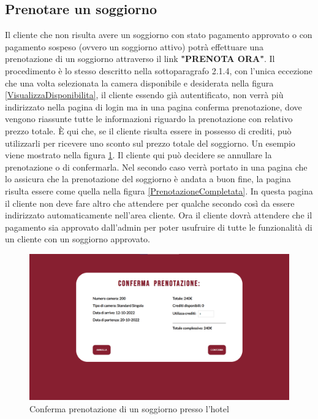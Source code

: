\documentclass [a4paper, 12pt]{book}
\begin{document}
\subsection{Prenotare un soggiorno}
Il cliente che non risulta avere un soggiorno con stato pagamento approvato o con pagamento sospeso (ovvero un soggiorno attivo) potrà effettuare una prenotazione di un soggiorno attraverso il link \textbf{"PRENOTA ORA"}. Il procedimento è lo stesso descritto nella sottoparagrafo 2.1.4, con l'unica eccezione che una volta selezionata la camera disponibile e desiderata nella figura \ref{VisualizzaDisponibilita}, il cliente essendo già autentificato, non verrà più indirizzato nella pagina di login ma in una pagina conferma prenotazione, dove vengono riassunte tutte le informazioni riguardo la prenotazione con relativo prezzo totale. È qui che, se il cliente risulta essere in possesso di crediti, può utilizzarli per ricevere uno sconto sul prezzo totale del soggiorno. Un esempio viene mostrato nella figura \ref{ConfermaPrenotazioneCamera}. Il cliente qui può decidere se annullare la prenotazione o di confermarla. Nel secondo caso verrà portato in una pagina che lo assicura che la prenotazione del soggiorno è andata a buon fine, la pagina risulta essere come quella nella figura \ref{PrenotazioneCompletata}.  In questa pagina il cliente non deve fare altro che attendere per qualche secondo così da essere indirizzato automaticamente nell'area cliente. Ora il cliente dovrà attendere che il pagamento sia approvato dall'admin per poter usufruire di tutte le funzionalità di un cliente con un soggiorno approvato.
\begin{figure}[!h]
\centering
\includegraphics[scale=0.3]{ConfermaPrenotazioneCamera.png}
\caption{Conferma prenotazione di un soggiorno presso l'hotel}
\label{ConfermaPrenotazioneCamera}
\end{figure}
\end{document}
